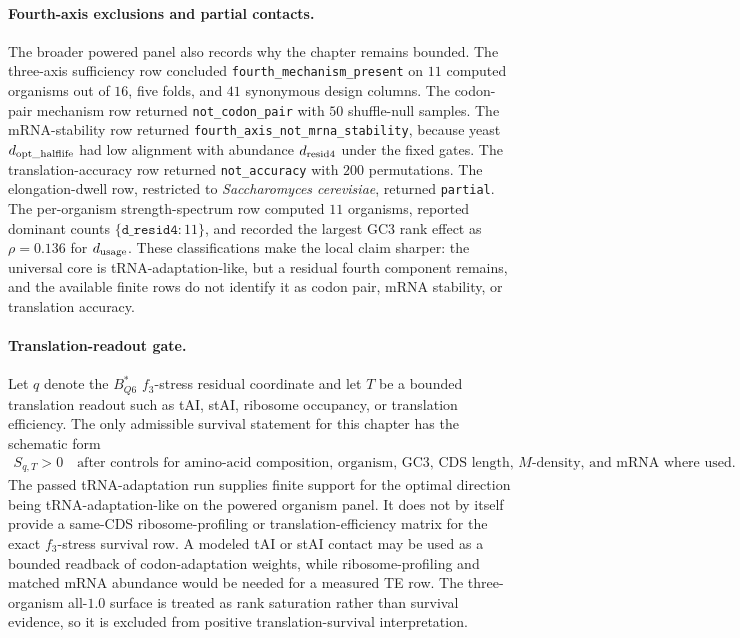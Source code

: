 \paragraph{Fourth-axis exclusions and partial contacts.}
The broader powered panel also records why the chapter remains bounded. The three-axis sufficiency row concluded \texttt{fourth\_mechanism\_present} on $11$ computed organisms out of $16$, five folds, and $41$ synonymous design columns. The codon-pair mechanism row returned \texttt{not\_codon\_pair} with $50$ shuffle-null samples. The mRNA-stability row returned \texttt{fourth\_axis\_not\_mrna\_stability}, because yeast $d_{\rm opt\_halflife}$ had low alignment with abundance $d_{\rm resid4}$ under the fixed gates. The translation-accuracy row returned \texttt{not\_accuracy} with $200$ permutations. The elongation-dwell row, restricted to \textit{Saccharomyces cerevisiae}, returned \texttt{partial}. The per-organism strength-spectrum row computed $11$ organisms, reported dominant counts $\{\texttt{d\_resid4}:11\}$, and recorded the largest GC3 rank effect as $\rho=0.136$ for $d_{\rm usage}$. These classifications make the local claim sharper: the universal core is tRNA-adaptation-like, but a residual fourth component remains, and the available finite rows do not identify it as codon pair, mRNA stability, or translation accuracy.

\paragraph{Translation-readout gate.}
Let $q$ denote the $B^*_{Q6}$ $f_3$-stress residual coordinate and let $T$ be a bounded translation readout such as tAI, stAI, ribosome occupancy, or translation efficiency. The only admissible survival statement for this chapter has the schematic form
$$
\begin{aligned}
S_{q,T}>0
\quad\text{after controls for amino-acid composition, organism, GC3, CDS length, }M\text{-density, and mRNA where used.}
\end{aligned}
$$
The passed tRNA-adaptation run supplies finite support for the optimal direction being tRNA-adaptation-like on the powered organism panel. It does not by itself provide a same-CDS ribosome-profiling or translation-efficiency matrix for the exact $f_3$-stress survival row. A modeled tAI or stAI contact may be used as a bounded readback of codon-adaptation weights, while ribosome-profiling and matched mRNA abundance would be needed for a measured TE row. The three-organism all-$1.0$ surface is treated as rank saturation rather than survival evidence, so it is excluded from positive translation-survival interpretation.

